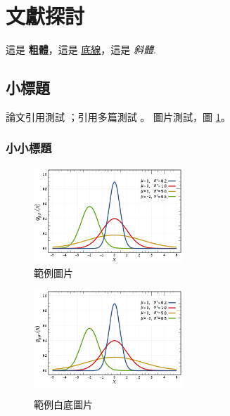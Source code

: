 
\section{文獻探討}

這是 \textbf{粗體}，這是 \underline{底線}，這是 \textit{斜體}.

\subsection{小標題}

論文引用測試 \cite{Rowe:2005:ASR}；引用多篇測試 \cite{Rowe:2005:ASR,vinet1989universal}。
圖片測試，圖 \ref{figure:fig1}。

\subsubsection{小小標題}

\begin{figure}[htbp]
    \centering
    \includegraphics[width=0.5\textwidth]{figures/gambar.png}
    \caption{範例圖片}
    \label{figure:fig1}
\end{figure}

\begin{figure}[htbp]
    \centering
    \colorbox{white}{\includegraphics[width=0.5\textwidth]{figures/gambar.png}}
    \caption{範例白底圖片}
    \label{figure:fig2}
\end{figure}


